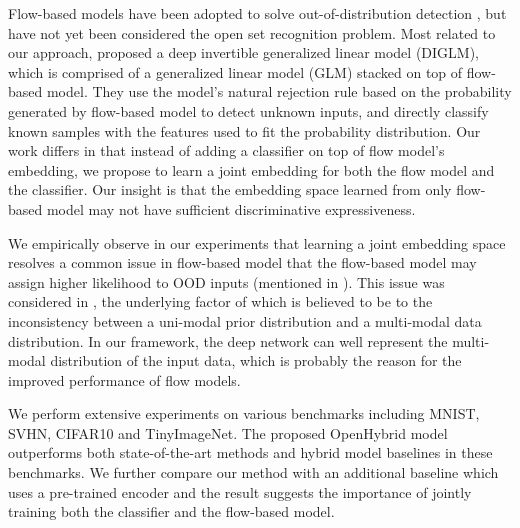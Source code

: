\documentclass[runningheads]{llncs}
\begin{document}
Flow-based models have been adopted to solve out-of-distribution detection \cite{nalisnick2019hybrid,nalisnick2018deep,hendrycks2018deep}, but have not yet been considered the open set recognition problem. Most related to our approach, \cite{nalisnick2019hybrid} proposed a deep invertible generalized linear model (DIGLM), which is comprised of a generalized linear model (GLM) stacked on top of flow-based model. They use the model's natural rejection rule based on the probability generated by flow-based model to detect unknown inputs, and directly classify known samples with the features used to fit the probability distribution. 
Our work differs in that instead of adding a classifier on top of flow model's embedding, we propose to learn a joint embedding for both the flow model and the classifier. Our insight is that the embedding space learned from only flow-based model may not have sufficient discriminative expressiveness. 

We empirically observe in our experiments that learning a joint embedding space resolves a common issue in flow-based model that the flow-based model may assign higher likelihood to OOD inputs (mentioned in \cite{hendrycks2018deep,ren2019likelihood,nalisnick2018deep}). 
This issue was considered in  \cite{kamoi2019likelihood}, the underlying factor of which is believed to be to the inconsistency between a uni-modal prior distribution and a multi-modal data distribution. In our framework, the deep network can well represent the multi-modal distribution of the input data, which is probably the reason for the improved performance of flow models.

We perform extensive experiments on various benchmarks including MNIST, SVHN, CIFAR10 and TinyImageNet. The proposed OpenHybrid model outperforms both state-of-the-art methods \cite{bendale2016towards,ge2017generative,neal2018open,oza2019c2ae,yoshihashi2019classification} and hybrid model baselines \cite{nalisnick2019hybrid,hendrycks2018deep} in these benchmarks. We further compare our method with an additional baseline which uses a pre-trained encoder and the result suggests the importance of jointly training both the classifier and the flow-based model.
\end{document}
